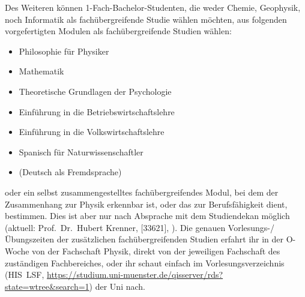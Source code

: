 {\small
Des Weiteren können 1-Fach-Bachelor-Studenten, die weder Chemie, Geophysik, noch Informatik als fachübergreifende Studie wählen möchten, aus folgenden vorgefertigten Modulen als fachübergreifende Studien wählen:
\begin{itemize}[nosep]
	\item Philosophie für Physiker
	\item Mathematik
	\item Theoretische Grundlagen der Psychologie
	\item Einführung in die Betriebswirtschaftslehre
	\item Einführung in die Volkswirtschaftslehre
	\item Spanisch für Naturwissenschaftler
	\item (Deutsch als Fremdsprache)
\end{itemize}
oder ein selbst zusammengestelltes fachübergreifendes Modul, bei dem der Zusammenhang zur Physik erkennbar ist, oder das zur Berufsfähigkeit dient, bestimmen.
Dies ist aber nur nach Absprache mit dem Studiendekan möglich (aktuell: Prof.\ Dr.\ Hubert Krenner, [33621], ).
Die genauen Vorlesungs-/Übungszeiten der zusätzlichen fachübergreifenden Studien erfahrt ihr in der O-Woche von der Fachschaft Physik, direkt von der jeweiligen Fachschaft des zuständigen Fachbereiches, oder ihr schaut einfach im Vorlesungsverzeichnis (HIS~LSF, \url{https://studium.uni-muenster.de/qisserver/rds?state=wtree&search=1}) der Uni nach.
}
